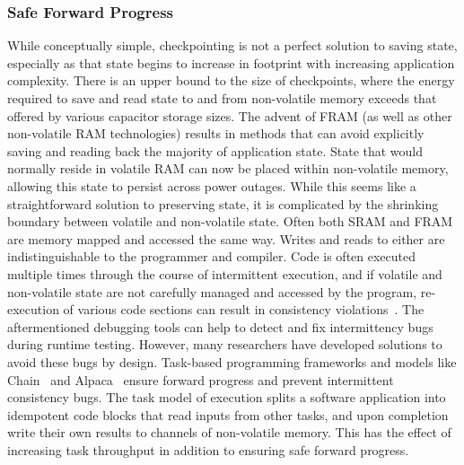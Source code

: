 \subsubsection{Safe Forward Progress}
While conceptually simple, checkpointing is not a perfect solution to saving state, especially as that state begins to increase in footprint with increasing application complexity.
There is an upper bound to the size of checkpoints, where the energy required to save and read state to and from non-volatile memory exceeds that offered by various capacitor storage sizes.
The advent of FRAM (as well as other non-volatile RAM technologies) results in methods that can avoid explicitly saving and reading back the majority of application state. State that would normally reside in volatile RAM can now be placed within non-volatile memory, allowing this state to persist across power outages.
While this seems like a straightforward solution to preserving state, it is complicated by the shrinking
boundary between volatile and non-volatile state. Often both SRAM and FRAM are memory mapped and accessed the same way. Writes and reads to either are indistinguishable to the programmer and compiler.
Code is often executed multiple times through the course of intermittent execution, and if volatile and non-volatile state are not carefully managed and accessed by the program, re-execution of various code sections can result in consistency violations~\cite{maeng2017alpaca}.
The aftermentioned debugging tools can help to detect and fix intermittency bugs during runtime testing. However, many researchers have developed solutions to avoid these bugs by design.
Task-based programming frameworks and models like
Chain~\cite{colin2016chain} and Alpaca~\cite{maeng2017alpaca}
ensure forward progress and prevent intermittent consistency bugs.
The task model of execution splits a software application into idempotent code blocks that read inputs from other tasks, and upon completion write their own results to channels of non-volatile memory. This has the effect of increasing task throughput in addition to ensuring safe forward progress.

